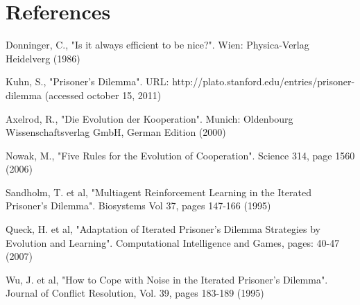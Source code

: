 \section{References}

\renewcommand{\refname}{}

\begin{thebibliography}{99}
		Donninger, C., "Is it always efficient to be nice?". Wien: Physica-Verlag Heidelverg (1986)

		Kuhn, S., "Prisoner's Dilemma". URL: http://plato.stanford.edu/entries/prisoner-dilemma (accessed october 15, 2011)

		Axelrod, R., "Die Evolution der Kooperation". Munich: Oldenbourg Wissenschaftsverlag GmbH, German Edition (2000)

		Nowak, M., "Five Rules for the Evolution of Cooperation".  Science 314, page 1560 (2006)

		Sandholm, T. et al, "Multiagent Reinforcement Learning in the Iterated Prisoner's Dilemma". Biosystems Vol 37, pages 147-166 (1995)

		Queck, H. et al, "Adaptation of Iterated Prisoner's Dilemma Strategies by Evolution and Learning". Computational Intelligence and Games, pages: 40-47 (2007)

		Wu, J. et al, "How to Cope with Noise in the Iterated Prisoner's Dilemma". Journal of Conflict Resolution, Vol. 39, pages 183-189 (1995)

\end{thebibliography}